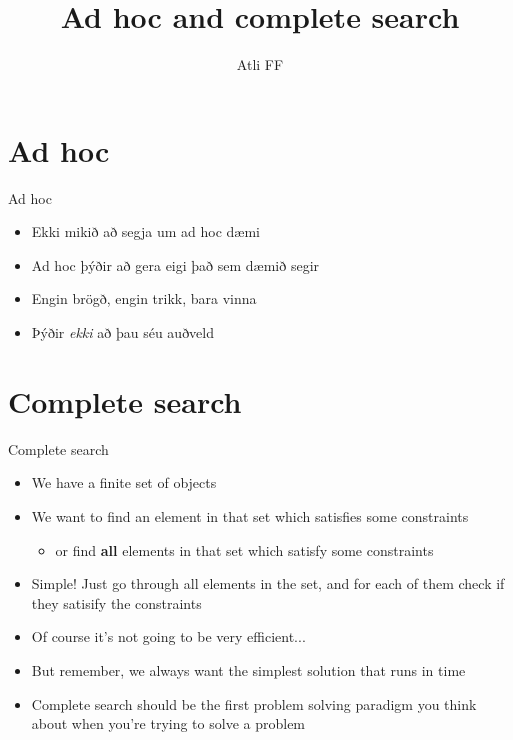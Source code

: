 \documentclass{beamer}
\title{Ad hoc and complete search}
\author{Atli FF}
\institute{\href{http://ru.is/td}{School of Computer Science} \\[2pt] \href{http://ru.is}{Reykjavík University}}
\begin{document}
\maketitle

\section*{Ad hoc}

\begin{frame}[plain]{Ad hoc}
    \begin{itemize}
        \item Ekki mikið að segja um ad hoc dæmi
        \item Ad hoc þýðir að gera eigi það sem dæmið segir
        \item Engin brögð, engin trikk, bara vinna
        \item Þýðir \textit{ekki} að þau séu auðveld
    \end{itemize}
\end{frame}

\section*{Complete search}

\begin{frame}[plain]{Complete search}
    \begin{itemize}
        \item We have a finite set of objects
        \item We want to find an element in that set which satisfies some constraints
        \begin{itemize}
            \item or find \textbf{all} elements in that set which satisfy some constraints
        \end{itemize}

        \vspace{5pt}
        \item Simple! Just go through all elements in the set, and for each of them check if they satisify the constraints
        \item Of course it's not going to be very efficient...
        \item But remember, we always want the simplest solution that runs in time
        \item Complete search should be the first problem solving paradigm you think about when you're trying to solve a problem
    \end{itemize}
\end{frame}
\end{document}
